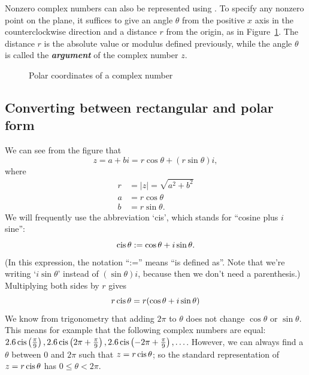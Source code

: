 Nonzero complex numbers can also be represented using . To specify any nonzero point on the plane, it suffices
to give an angle $\theta$ from the positive $x$ axis in the counterclockwise
direction and a distance $r$ from the origin, as in Figure~\ref{polarcoord}.
The distance  $r$ is the absolute value or modulus defined previously, while the angle $\theta$ is called the {\bf \emph{argument}} of the complex number $z$.
\begin{figure}[htb]
\begin{center}

\end{center}
\caption{Polar coordinates of a complex number}
\label{polarcoord}
\end{figure}


\subsection{Converting between rectangular and polar form}

We can see from the figure that \[
z=a+bi=r\cos\theta+( r\sin\theta) i,\]
where
\begin{align*}
r&=|z|=\sqrt{a^{2}+b^{2}} \\
a & =r\cos\theta\\
b & =r\sin\theta.\end{align*}
 We will frequently use the abbreviation `cis', which stands for ``cosine plus $i$ sine'':
\[ \operatorname{cis}\theta := \cos\theta+i\sin\theta. \]
(In this expression, the notation ``:='' means ``is defined as''. Note that we're writing `$i\sin\theta$' instead of $(\sin \theta) i$, because then we don't need a parenthesis.) 
Multiplying both sides by $r$ gives
\[ r\operatorname{cis}\theta = r(\cos\theta+i\sin\theta)\]
We know from trigonometry that adding $2 \pi$ to $\theta$ does not change $\cos \theta$ or $\sin \theta$. This means for example that the following complex numbers are equal: $2.6 \operatorname{cis}\left(\frac{\pi}{9}\right), 2.6 \operatorname{cis}\left(2\pi + \frac{\pi}{9}\right), 2.6 \operatorname{cis}\left(-2\pi + \frac{\pi}{9}\right), \ldots $.  However, we can always find a $\theta$ between $0$ and $2\pi$ such that $z = r \operatorname{cis} \theta$;  so the standard representation of $z = r \operatorname{cis} \theta$ has $0 \leq \theta < 2\pi$.

